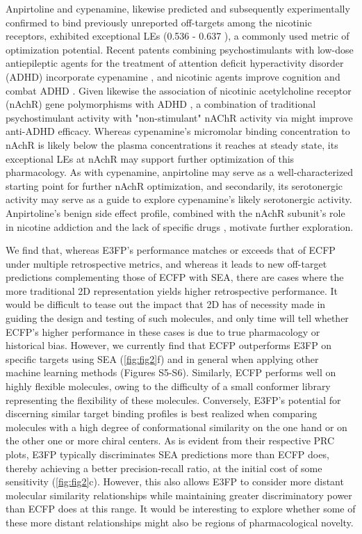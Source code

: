 \documentclass[../../main.tex]{subfiles}
\begin{document}
\begin{refsection}
	Anpirtoline and cypenamine, likewise predicted and subsequently experimentally confirmed to bind previously unreported off-targets among the nicotinic receptors, exhibited exceptional LEs (0.536 - 0.637  \LEunit{}), a commonly used metric of optimization potential.
	Recent patents combining psychostimulants with low-dose antiepileptic agents for the treatment of attention deficit hyperactivity disorder  (ADHD) incorporate cypenamine \supercite{bird_2016,bird_2015}, and nicotinic agents improve cognition and combat ADHD \supercite{fleisher_2014}.
	Given likewise the association of nicotinic acetylcholine receptor (nAchR)  gene polymorphisms with ADHD \supercite{kent_2001}, a combination of traditional psychostimulant activity with "non-stimulant" nAChR activity via  might improve anti-ADHD efficacy.
	Whereas cypenamine's micromolar binding concentration to nAchR is likely below the plasma concentrations it reaches at steady state, its exceptional LEs at nAchR may support further optimization of this pharmacology.
	As with cypenamine, anpirtoline may serve as a well-characterized starting point for further nAchR optimization, and secondarily, its serotonergic activity may serve as a guide to explore cypenamine's likely serotonergic activity.
	Anpirtoline's benign side effect profile, combined with the nAchR  subunit's role in nicotine addiction  \supercite{salas_2004} and the lack of  specific drugs  \supercite{zaveri_2010} , motivate further exploration.

	We find that, whereas E3FP's performance matches or exceeds that of ECFP under multiple retrospective metrics, and whereas it leads to new off-target predictions complementing those of ECFP with SEA, there are cases where the more traditional 2D representation yields higher retrospective performance.
	It would be difficult to tease out the impact that 2D has of necessity made in guiding the design and testing of such molecules, and only time will tell whether ECFP's higher performance in these cases is due to true pharmacology or historical bias.
	However, we currently find that ECFP outperforms E3FP on specific targets using SEA  (\cref{fig:fig2}f) and in general when applying other machine learning methods  (Figures S5-S6).
	Similarly, ECFP performs well on highly flexible molecules, owing to the difficulty of a small conformer library representing the flexibility of these molecules.
	Conversely, E3FP's potential for discerning similar target binding profiles is best realized when comparing molecules with a high degree of conformational similarity on the one hand or on the other one or more chiral centers.
	As is evident from their respective PRC plots, E3FP typically discriminates SEA predictions more than ECFP does, thereby achieving a better precision-recall ratio, at the initial cost of some sensitivity  (\cref{fig:fig2}c).
	However, this also allows E3FP to consider more distant molecular similarity relationships while maintaining greater discriminatory power than ECFP does at this range.
	It would be interesting to explore whether some of these more distant relationships might also be regions of pharmacological novelty.


\end{refsection}
\end{document}
